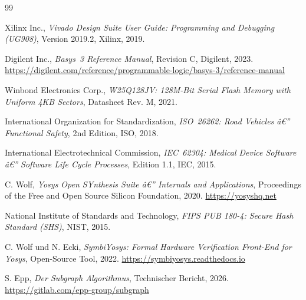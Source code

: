 ﻿\documentclass[a4paper,12pt]{article}
\theoremstyle{definition}
\begin{document}
\begin{thebibliography}{99}

Xilinx Inc.,
\emph{Vivado Design Suite User Guide: Programming and Debugging (UG908)},
Version 2019.2, Xilinx, 2019.

Digilent Inc.,
\emph{Basys~3 Reference Manual},
Revision C, Digilent, 2023.
\url{https://digilent.com/reference/programmable-logic/basys-3/reference-manual}

Winbond Electronics Corp.,
\emph{W25Q128JV: 128M-Bit Serial Flash Memory with Uniform 4KB Sectors},
Datasheet Rev. M, 2021.

International Organization for Standardization,
\emph{ISO~26262: Road Vehicles â€” Functional Safety},
2nd Edition, ISO, 2018.

International Electrotechnical Commission,
\emph{IEC~62304: Medical Device Software â€” Software Life Cycle Processes},
Edition 1.1, IEC, 2015.

C. Wolf,
\emph{Yosys Open SYnthesis Suite â€” Internals and Applications},
Proceedings of the Free and Open Source Silicon Foundation, 2020.
\url{https://yosyshq.net}

National Institute of Standards and Technology,
\emph{FIPS PUB 180-4: Secure Hash Standard (SHS)},
NIST, 2015.

C. Wolf und N. Ecki,
\emph{SymbiYosys: Formal Hardware Verification Front-End for Yosys},
Open-Source Tool, 2022.
\url{https://symbiyosys.readthedocs.io}

S. Epp,
\emph{Der Subgraph Algorithmus},
Technischer Bericht, 2026.
\url{https://gitlab.com/epp-group/subgraph}

\end{thebibliography}
\end{document}
